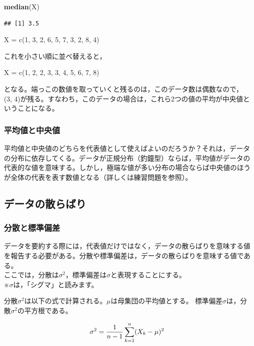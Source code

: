 \documentclass[]{article}
\newenvironment{Shaded}{\begin{snugshade}}{\end{snugshade}}
\newcommand{\KeywordTok}[1]{\textcolor[rgb]{0.13,0.29,0.53}{\textbf{#1}}}
\newcommand{\NormalTok}[1]{#1}
\begin{document}
\begin{Shaded}
\begin{Highlighting}[]
\KeywordTok{median}\NormalTok{(X)}
\end{Highlighting}
\end{Shaded}

\begin{verbatim}
## [1] 3.5
\end{verbatim}

X = c(1, 3, 2, 6, 5, 7, 3, 2, 8, 4)

これを小さい順に並べ替えると，

X = c(1, 2, 2, 3, 3, 4, 5, 6, 7, 8)

となる。端っこの数値を取っていくと残るのは，このデータ数は偶数なので，(3,
4)が残る。すなわち，このデータの場合は，これら2つの値の平均が中央値ということになる。

\subsubsection{平均値と中央値}

平均値と中央値のどちらを代表値として使えばよいのだろうか？それは，データの分布に依存してくる。データが正規分布（釣鐘型）ならば，平均値がデータの代表的な値を意味する。しかし，極端な値が多い分布の場合ならば中央値のほうが全体の代表を表す数値となる（詳しくは練習問題を参照）。

\subsection{データの散らばり}

\subsubsection{分散と標準偏差}

データを要約する際には，代表値だけではなく，データの散らばりを意味する値を報告する必要がある。分散や標準偏差は，データの散らばりを意味する値である。\\
ここでは，分散は\(\sigma^2\)，標準偏差は\(\sigma\)と表現することにする。\\
※\(\sigma\)は，「シグマ」と読みます。

分散\(\sigma^2\)は以下の式で計算される。\(\mu\)は母集団の平均値とする。
標準偏差\(\sigma\)は，分散\(\sigma^2\)の平方根である。

\[
\sigma^2 = \frac{1}{n-1}\sum_{k=1}^{n}(X_{k}-\mu)^2\\  
\]
\end{document}
